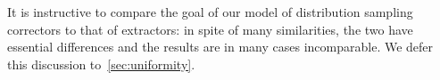 It is instructive to compare the goal of our model of distribution
sampling correctors to that of extractors: in spite of many similarities, the two have essential differences and the results are in many cases incomparable. We defer this discussion to~\autoref{sec:uniformity}.

